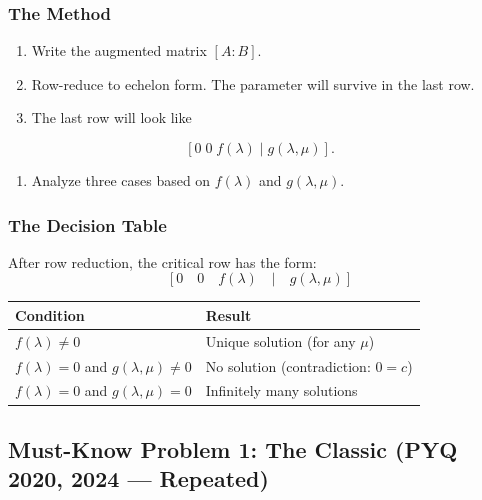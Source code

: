 \documentclass[
]{article}
\providecommand{\tightlist}{%
  \setlength{\itemsep}{0pt}\setlength{\parskip}{0pt}}
\begin{document}
\subsubsection{The Method}\label{the-method-5}

\begin{enumerate}
\def\labelenumi{\arabic{enumi}.}
\tightlist
\item
  Write the augmented matrix \([A:B]\).
\item
  Row-reduce to echelon form. The parameter will survive in the last
  row.
\item
  The last row will look like
\end{enumerate}
\[
[0 \; 0 \; f(\lambda) \; \lvert  \; g(\lambda, \mu)].
\]
\begin{enumerate}
\def\labelenumi{\arabic{enumi}.}
\setcounter{enumi}{3}
\tightlist
\item
  Analyze three cases based on \(f(\lambda)\) and \(g(\lambda, \mu)\).
\end{enumerate}

\subsubsection{The Decision Table}\label{the-decision-table}

After row reduction, the critical row has the form:
\[
[0 \quad 0 \quad f(\lambda) \quad | \quad g(\lambda, \mu)]
\]
\begin{longtable}[]{@{}
  >{\raggedright\arraybackslash}p{}
  >{\raggedright\arraybackslash}p{}@{}}
\toprule\noalign{}
\begin{minipage}[b]{\linewidth}\raggedright
Condition
\end{minipage} & \begin{minipage}[b]{\linewidth}\raggedright
Result
\end{minipage} \\
\midrule\noalign{}
\endhead
\bottomrule\noalign{}
\endlastfoot
\(f(\lambda) \neq 0\) & Unique solution (for any \(\mu\)) \\
\(f(\lambda) = 0\) and \(g(\lambda, \mu) \neq 0\) & No solution
(contradiction: \(0 = c\)) \\
\(f(\lambda) = 0\) and \(g(\lambda, \mu) = 0\) & Infinitely many
solutions \\
\end{longtable}

\subsection{Must-Know Problem 1: The Classic (PYQ 2020, 2024 ---
Repeated)}\label{must-know-problem-1-the-classic-pyq-2020-2024-repeated}
\end{document}
